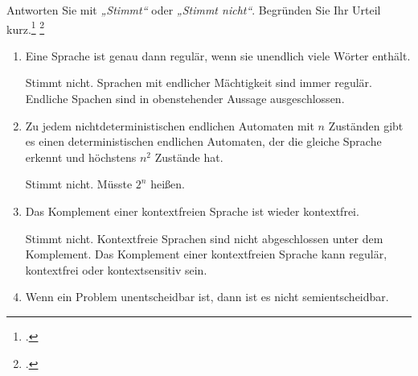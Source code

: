 \documentclass{bschlangaul-aufgabe}
\begin{document}

Antworten Sie mit \emph{„Stimmt“} oder \emph{„Stimmt nicht“}. Begründen
Sie Ihr Urteil kurz.\footcite[Seite 55-56]{theo:fs:4}
\footcite{examen:66115:2020:09}


\begin{enumerate}


\item Eine Sprache ist genau dann regulär, wenn sie unendlich viele
Wörter enthält.

\begin{liAntwort}
Stimmt nicht. Sprachen mit endlicher Mächtigkeit sind immer regulär.
Endliche Spachen sind in obenstehender Aussage ausgeschlossen.
\end{liAntwort}


\item Zu jedem nichtdeterministischen endlichen Automaten mit $n$
Zuständen gibt es einen deterministischen endlichen Automaten, der die
gleiche Sprache erkennt und höchstens $n^2$ Zustände hat.

\begin{liAntwort}
Stimmt nicht. Müsste $2^n$ heißen.
\end{liAntwort}


\item Das Komplement einer kontextfreien Sprache ist wieder kontextfrei.

\begin{liAntwort}
Stimmt nicht. Kontextfreie Sprachen sind nicht abgeschlossen unter dem
Komplement. Das Komplement einer kontextfreien Sprache kann regulär,
kontextfrei oder kontextsensitiv sein.
\end{liAntwort}


\item Wenn ein Problem unentscheidbar ist, dann ist es nicht
semientscheidbar.


\end{enumerate}
\end{document}
